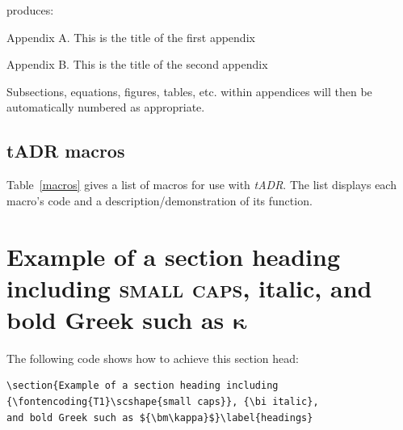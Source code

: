 \documentclass{tADR2e}
\begin{document}
\noindent produces:\medskip

\noindent Appendix A. This is the title of the first appendix

\noindent Appendix B. This is the title of the second appendix

\medskip
Subsections, equations, figures, tables, etc. within
appendices will then be automatically numbered as appropriate.


\subsection{{\bi tADR} macros}
Table~\ref{macros} gives a list of macros for use with {\it tADR}. The list displays each macro's code and a
description/demonstration of its function.

\begin{table} 
\label{macros}
\end{table}


\section{Example of a section heading including {\scshape{small caps}},
   {\bi italic}, and bold Greek such as ${\bm\kappa}$}\label{headings}
%
The following code shows how to achieve this section head:
%
\begin{verbatim}
\section{Example of a section heading including
{\fontencoding{T1}\scshape{small caps}}, {\bi italic},
and bold Greek such as ${\bm\kappa}$}\label{headings}
\end{verbatim}
%
\end{document}
